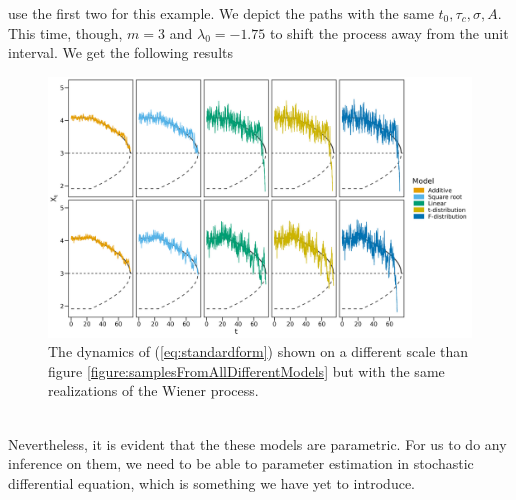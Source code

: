 use the first two for this example. We depict the paths with the same $t_0, \tau_c, \sigma, A$. This time, though, $m = 3$ and $\lambda_0 = -1.75$ to shift the process away from the unit interval. We get the following results
\begin{figure}[h]
    \begin{center}
        \includegraphics[scale = .1]{figures/sample_paths_plot_big_scale.jpeg}
        \caption{The dynamics of (\ref{eq:standardform}) shown on a different scale than figure \ref{figure:samplesFromAllDifferentModels} but with the same realizations of the Wiener process.}
        \label{figure:samplesFromFiveDifferentModels}
    \end{center}
\end{figure}\\
Nevertheless, it is evident that the these models are parametric. For us to do any inference on them, we need to be able to parameter estimation in stochastic differential equation, which is something we have yet to introduce. 
\newpage
